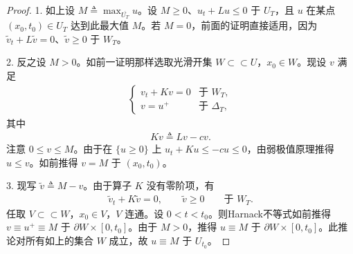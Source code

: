 \documentclass[../../main.tex]{subfiles}
\begin{document}
\begin{proof}
1. 如上设 $M\triangleq\max_{\overline{U_T}}u$。设 $M\geqslant 0$、$u_t+Lu\leqslant 0$ 于 $U_T$，且 $u$ 在某点 $(x_0,t_0)\in U_T$ 达到此最大值 $M$。若 $M=0$，前面的证明直接适用，因为 $\widetilde{v}_t+L\widetilde{v}=0$、$\widetilde{v}\geqslant 0$ 于 $W_T$。

2. 反之设 $M>0$。如前一证明那样选取光滑开集 $W\subset\subset U$，$x_0\in W$。现设 $v$ 满足
\begin{align*}
\begin{cases}
v_t+Kv=0 & \text{于 } W_T,\\
v=u^+ & \text{于 } \Delta_T,
\end{cases}
\end{align*}
其中
\begin{align*}
Kv\triangleq Lv-cv.
\end{align*}
注意 $0\leqslant v\leqslant M$。由于在 $\{u\geqslant 0\}$ 上 $u_t+Ku\leqslant -cu\leqslant 0$，由弱极值原理推得 $u\leqslant v$。如前推得 $v=M$ 于 $(x_0,t_0)$。

3. 现写 $\widetilde{v}\triangleq M-v$。由于算子 $K$ 没有零阶项，有
\begin{align*}
\widetilde{v}_t+K\widetilde{v}=0,\qquad \widetilde{v}\geqslant 0\qquad \text{于 } W_T.
\end{align*}
任取 $V\subset\subset W$，$x_0\in V$，$V$ 连通。设 $0<t<t_0$。则Harnack不等式如前推得 $v\equiv u^+\equiv M$ 于 $\partial W\times[0,t_0]$。由于 $M>0$，推得 $u\equiv M$ 于 $\partial W\times[0,t_0]$。此推论对所有如上的集合 $W$ 成立，故 $u\equiv M$ 于 $U_{t_0}$。
\end{proof}
\end{document}
